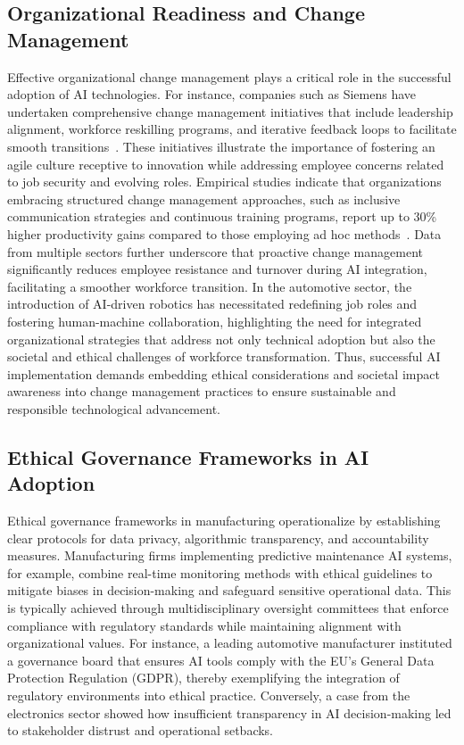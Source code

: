 \documentclass[sigconf]{acmart}
\begin{document}
\subsection{Organizational Readiness and Change Management}

Effective organizational change management plays a critical role in the successful adoption of AI technologies. For instance, companies such as Siemens have undertaken comprehensive change management initiatives that include leadership alignment, workforce reskilling programs, and iterative feedback loops to facilitate smooth transitions~\cite{}. These initiatives illustrate the importance of fostering an agile culture receptive to innovation while addressing employee concerns related to job security and evolving roles. Empirical studies indicate that organizations embracing structured change management approaches, such as inclusive communication strategies and continuous training programs, report up to 30\% higher productivity gains compared to those employing ad hoc methods~\cite{}. Data from multiple sectors further underscore that proactive change management significantly reduces employee resistance and turnover during AI integration, facilitating a smoother workforce transition. In the automotive sector, the introduction of AI-driven robotics has necessitated redefining job roles and fostering human-machine collaboration, highlighting the need for integrated organizational strategies that address not only technical adoption but also the societal and ethical challenges of workforce transformation. Thus, successful AI implementation demands embedding ethical considerations and societal impact awareness into change management practices to ensure sustainable and responsible technological advancement.

\subsection{Ethical Governance Frameworks in AI Adoption}

Ethical governance frameworks in manufacturing operationalize by establishing clear protocols for data privacy, algorithmic transparency, and accountability measures. Manufacturing firms implementing predictive maintenance AI systems, for example, combine real-time monitoring methods with ethical guidelines to mitigate biases in decision-making and safeguard sensitive operational data. This is typically achieved through multidisciplinary oversight committees that enforce compliance with regulatory standards while maintaining alignment with organizational values. For instance, a leading automotive manufacturer instituted a governance board that ensures AI tools comply with the EU's General Data Protection Regulation (GDPR), thereby exemplifying the integration of regulatory environments into ethical practice. Conversely, a case from the electronics sector showed how insufficient transparency in AI decision-making led to stakeholder distrust and operational setbacks. 
\end{document}
